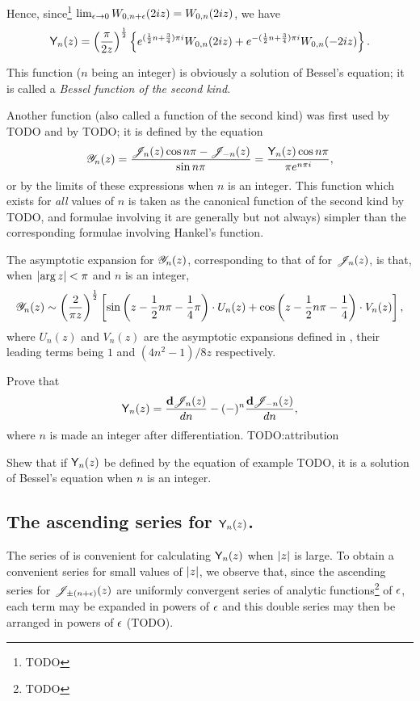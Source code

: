 \documentclass{book}
\begin{document}
Hence, since\footnote{TODO}
$\lim_{\epsilon\rightarrow 0} W_{0,n+\epsilon}(2iz) = W_{0,n}(2iz)$, we
have
$$
\mathsf{Y}_n(z)
=
\left(  \frac{\pi}{2z}  \right)^{\frac{1}{2}}
\left\{ 
  e^{(\frac{1}{2} n + \frac{3}{4}) \pi i} W_{0,n}(2iz)
  +
  e^{-(\frac{1}{2} n + \frac{3}{4})\pi i} W_{0,n}(-2iz)
 \right\}.
$$

This function ($n$ being an integer) is obviously a solution of
Bessel's equation; it is called a \emph{Bessel function of the
  second kind}.

Another function (also called a function of the second kind) was
first used by TODO and by TODO; it is defined by the equation
$$
\mathscr{Y}_n(z) = \frac{\mathscr{J}_n(z) \cos n\pi - \mathscr{J}_{-n}(z)}{\sin n\pi}
= \frac{\mathsf{Y}_n(z) \cos n\pi}{\pi e^{n\pi i}},
$$
% 
% 
or by the limits of these expressions when $n$ is an integer. This
function which exists for \emph{all} values of $n$ is taken as the
canonical function of the second kind by TODO, and formulae
involving it are generally but not always) simpler than the
corresponding formulae involving Hankel's function.

The asymptotic expansion for $\mathscr{Y}_n(z)$, corresponding to that of
 for $\mathscr{J}_n(z)$, is that, when
$\left| \arg z \right| < \pi$ and $n$ is an integer,
$$
\mathscr{Y}_n(z)
\sim
\left(  \frac{2}{\pi z}  \right)^{\frac{1}{2}}
\left[  \sin\left( z - \frac{1}{2} n \pi - \frac{1}{4} \pi \right)
  \cdot U_n(z)
  + \cos\left( z - \frac{1}{2} n \pi - \frac{1}{4} \right) \cdot V_n(z)
 \right],
$$
where $U_n(z)$ and $V_n(z)$ are the asymptotic expansions defined
in , their leading terms being $1$ and
$(4n^2-1)/8z$ respectively.
\begin{wandwexample}
  Prove that
  $$
  \mathsf{Y}_n(z)
  =
  \frac{\mathbf{d}\mathscr{J}_n(z)}{dn}
  -
  (-)^n \frac{\mathbf{d}\mathscr{J}_{-n}(z)}{dn},
  $$
  where $n$ is made an integer after differentiation.
  TODO:attribution
\end{wandwexample}
\begin{wandwexample}
  Shew that if $\mathsf{Y}_n(z)$ be defined by the equation of example
  TODO, it is a solution of Bessel's equation when $n$ is an integer.
\end{wandwexample}
\subsection{The ascending series for $\mathsf{Y}_n(z)$.}
The series of  is convenient for calculating
$\mathsf{Y}_n(z)$ when $\left| z \right|$ is large. To obtain a convenient
series for small values of $\left| z \right|$, we observe that, since
the ascending series for $\mathscr{J}_{\pm (n+\epsilon)}(z)$ are uniformly
convergent series of analytic functions\footnote{TODO} of $\epsilon$,
each term may be expanded in powers of $\epsilon$ and this double
series may then be arranged in powers of
$\epsilon$ (TODO).
\end{document}
